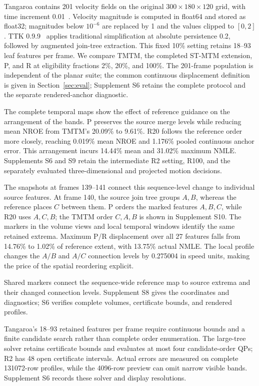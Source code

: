 Tangaroa contains 201 velocity fields on the original $300\times180\times120$ grid, with time increment 0.01~\cite{Popinet:2004:Tangaroa}. Velocity magnitude is computed in float64 and stored as float32; magnitudes below $10^{-6}$ are replaced by 1 and the values clipped to $[0,2]$. TTK 0.9.9~\cite{Tierny:2018:TTK} applies traditional simplification at absolute persistence 0.2, followed by augmented join-tree extraction. This fixed 10\% setting retains 18--93 leaf features per frame. We compare TMTM, the completed ST-MTM extension, P, and R at eligibility fractions 2\%, 20\%, and 100\%. The 201-frame population is independent of the planar suite; the common continuous displacement definition is given in Section~\ref{sec:eval}; Supplement S6 retains the complete protocol and the separate rendered-anchor diagnostic.

The complete temporal maps show the effect of reference guidance on the arrangement of the bands. P preserves the source merge levels while reducing mean NROE from TMTM's 20.09\% to 9.61\%. R20 follows the reference order more closely, reaching 0.019\% mean NROE and 1.176\% pooled continuous anchor error. This arrangement incurs 14.44\% mean and 31.02\% maximum NMLE. Supplements S6 and S9 retain the intermediate R2 setting, R100, and the separately evaluated three-dimensional and projected motion decisions.

The snapshots at frames 139--141 connect this sequence-level change to individual source features. At frame 140, the source join tree groups $A,B$, whereas the reference places $C$ between them. P orders the marked features $A,B,C$, while R20 uses $A,C,B$; the TMTM order $C,A,B$ is shown in Supplement S10. The markers in the volume views and local temporal windows identify the same retained extrema. Maximum P/R displacement over all 27 features falls from 14.76\% to 1.02\% of reference extent, with 13.75\% actual NMLE. The local profile changes the $A/B$ and $A/C$ connection levels by 0.275004 in speed units, making the price of the spatial reordering explicit.

Shared markers connect the sequence-wide reference map to source extrema and their changed connection levels. Supplement S8 gives the coordinates and diagnostics; S6 verifies complete volumes, certificate bounds, and rendered profiles.

Tangaroa's 18--93 retained features per frame require continuous bounds and a finite candidate search rather than complete order enumeration. The large-tree solver retains certificate bounds and evaluates at most four candidate-order QPs; R2 has 48 open certificate intervals. Actual errors are measured on complete 131072-row profiles, while the 4096-row preview can omit narrow visible bands. Supplement S6 records these solver and display resolutions.

